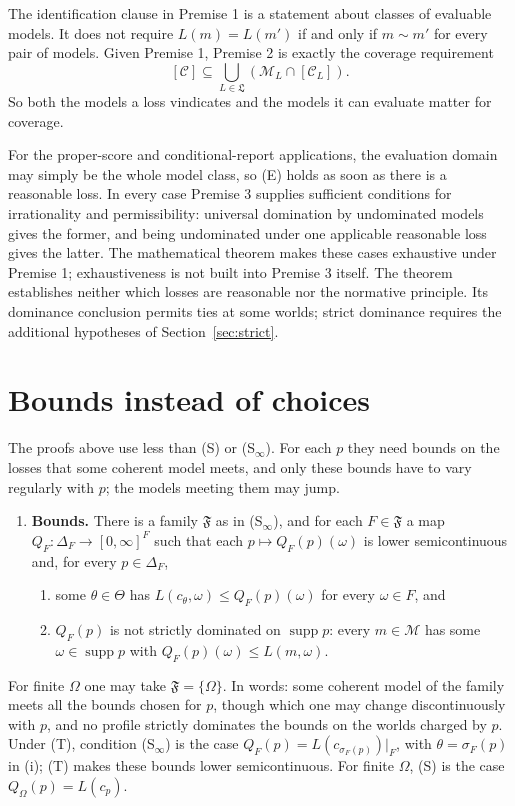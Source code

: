 \documentclass[11pt]{article}
\theoremstyle{definition}
\theoremstyle{remark}
\newcommand{\M}{\mathcal M}
\newcommand{\C}{\mathcal C}
\newcommand{\F}{\mathfrak F}
\newcommand{\supp}{\operatorname{supp}}
\begin{document}
The identification clause in Premise 1 is a statement about classes of evaluable models. It does not require $L(m)=L(m')$ if and only if $m\sim m'$ for every pair of models. Given Premise 1, Premise 2 is exactly the coverage requirement
\[
 [\C]\subseteq\bigcup_{L\in\mathfrak L}(\M_L\cap[\C_L]).
\]
So both the models a loss vindicates and the models it can evaluate matter for coverage.


For the proper-score and conditional-report applications, the evaluation domain may simply be the whole model class, so (E) holds as soon as there is a reasonable loss. In every case Premise 3 supplies sufficient conditions for irrationality and permissibility: universal domination by undominated models gives the former, and being undominated under one applicable reasonable loss gives the latter. The mathematical theorem makes these cases exhaustive under Premise 1; exhaustiveness is not built into Premise 3 itself. The theorem establishes neither which losses are reasonable nor the normative principle. Its dominance conclusion permits ties at some worlds; strict dominance requires the additional hypotheses of Section~\ref{sec:strict}.

\appendix
\section{Bounds instead of choices}\label{sec:bounds}
The proofs above use less than (S) or (S$_\infty$). For each $p$ they need bounds on the losses that some coherent model meets, and only these bounds have to vary regularly with $p$; the models meeting them may jump.
\begin{enumerate}[label=\textbf{(B)},leftmargin=*]
\item \textbf{Bounds.} There is a family $\F$ as in (S$_\infty$), and for each $F\in\F$ a map $Q_F:\Delta_F\to[0,\infty]^F$ such that each $p\mapsto Q_F(p)(\omega)$ is lower semicontinuous and, for every $p\in\Delta_F$,
\begin{enumerate}[label=(\roman*)]
\item some $\theta\in\Theta$ has $L(c_\theta,\omega)\le Q_F(p)(\omega)$ for every $\omega\in F$, and
\item $Q_F(p)$ is not strictly dominated on $\supp p$: every $m\in\M$ has some $\omega\in\supp p$ with $Q_F(p)(\omega)\le L(m,\omega)$.
\end{enumerate}
\end{enumerate}
For finite $\Omega$ one may take $\F=\{\Omega\}$. In words: some coherent model of the family meets all the bounds chosen for $p$, though which one may change discontinuously with $p$, and no profile strictly dominates the bounds on the worlds charged by $p$. Under (T), condition (S$_\infty$) is the case $Q_F(p)=L(c_{\sigma_F(p)})|_F$, with $\theta=\sigma_F(p)$ in (i); (T) makes these bounds lower semicontinuous. For finite $\Omega$, (S) is the case $Q_\Omega(p)=L(c_p)$.
\end{document}
